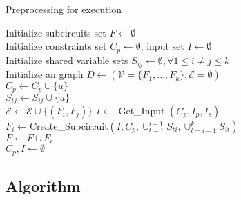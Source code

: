 \begin{algorithm}[t]
\caption{Preprocessing for execution}
\label{alg:Subcircuit Construction}  %


Initialize subcircuits set $F \gets \emptyset$ \\
Initialize constraints set $C_p \gets \emptyset$, input set $I \gets \emptyset$\\
Initialize shared variable sets $S_{ij} \gets \emptyset, \forall 1\le i\ne j \le k$  \\

Initialize an graph $D \gets (\mathcal{V}=\{F_1,\ldots, F_k\}, \mathcal{E}=\emptyset)$ \\

 {
     {
        $C_p \gets C_p \cup \{u\}$ \label{stmt:constraint_add}\\
         {
             {
            $S_{ij} \gets S_{ij} \cup \{u\}$  \\   
                $\mathcal{E}\gets \mathcal{E}\cup\{(F_i, F_j)\}$ \label{stmt:process_child_end}
            }
        }
    }
    $I \gets$ Get\_Input $(C_p, I_p, I_s)$ \label{stmt:construct_subcircuit_start}\\
    $F_i \gets$Create\_Subcircuit$(I, C_p, \cup_{t=1}^{i-1}S_{ti}, \cup_{t=i+1}^{k}S_{it})$ \label{stmt:construct_subcircuit_end}\\
    $F\gets F\cup F_i$ \\
    $C_p, I \gets \emptyset$\\
}
  

\end{algorithm}



\subsection{Algorithm}



